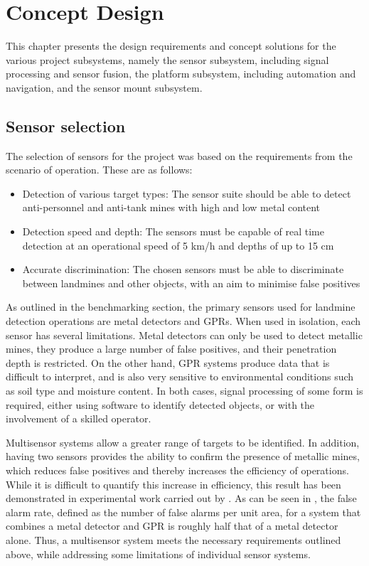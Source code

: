 \documentclass[main.tex]{subfiles}
\begin{document}
\chapter{Concept Design}

This chapter presents the design requirements and concept solutions for the various project subsystems, namely the sensor subsystem, including signal processing and sensor fusion, the platform subsystem, including automation and navigation, and the sensor mount subsystem.

\section{Sensor selection}
The selection of sensors for the project was based on the requirements from the scenario of operation. These are as follows:

\begin{itemize}
\item Detection of various target types: The sensor suite should be able to detect anti-personnel and anti-tank mines with high and low metal content 
\item Detection speed and depth: The sensors must be capable of real time detection at an operational speed of 5 km/h and depths of up to 15 cm
\item Accurate discrimination: The chosen sensors must be able to discriminate between landmines and other objects, with an aim to minimise false positives
\end{itemize}

As outlined in the benchmarking section, the primary sensors used for landmine detection operations are metal detectors and GPRs. When used in isolation, each sensor has several limitations. Metal detectors can only be used to detect metallic mines, they produce a large number of false positives, and their penetration depth is restricted. On the other hand, GPR systems produce data that is difficult to interpret, and is also very sensitive to environmental conditions such as soil type and moisture content. In both cases, signal processing of some form is required, either using software to identify detected objects, or with the involvement of a skilled operator.

Multisensor systems allow a greater range of targets to be identified. In addition, having two sensors provides the ability to confirm the presence of metallic mines, which reduces false positives and thereby increases the efficiency of operations. While it is difficult to quantify this increase in efficiency, this result has been demonstrated in experimental work carried out by \textcite{Takahashi10}. As can be seen in , the false alarm rate, defined as the number of false alarms per unit area, for a system that combines a metal detector and GPR is roughly half that of a metal detector alone. Thus, a multisensor system meets the necessary requirements outlined above, while addressing some limitations of individual sensor systems.
\end{document}
